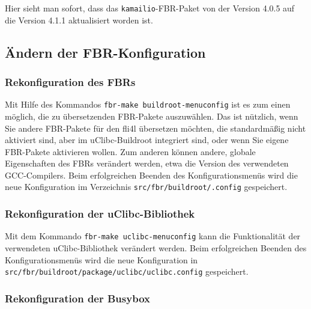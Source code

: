 Hier sieht man sofort, dass das \texttt{kamailio}-FBR-Paket von der Version
4.0.5 auf die Version 4.1.1 aktualisiert worden ist.

\subsection{Ändern der FBR-Konfiguration}

\subsubsection{Rekonfiguration des FBRs}

Mit Hilfe des Kommandos \texttt{fbr-make buildroot-menuconfig} ist es zum einen
möglich, die zu übersetzenden FBR-Pakete auszuwählen. Das ist nützlich, wenn Sie
andere FBR-Pakete für den fli4l übersetzen möchten, die standardmäßig nicht
aktiviert sind, aber im uClibc-Buildroot integriert sind, oder wenn Sie
eigene FBR-Pakete aktivieren wollen. Zum anderen können andere, globale
Eigenschaften des FBRs verändert werden, etwa die Version des verwendeten
GCC-Compilers. Beim erfolgreichen Beenden des Konfigurationsmenüs wird die neue
Konfiguration im Verzeichnis \texttt{src/fbr/buildroot/.config} gespeichert.


\subsubsection{Rekonfiguration der uClibc-Bibliothek}

Mit dem Kommando \texttt{fbr-make uclibc-menuconfig} kann die Funktionalität der
verwendeten uClibc-Bibliothek verändert werden. Beim erfolgreichen Beenden
des Konfigurationsmenüs wird die neue Konfiguration in
\texttt{src/fbr/buildroot/package/uclibc/uclibc.config} gespeichert.


\subsubsection{Rekonfiguration der Busybox}


